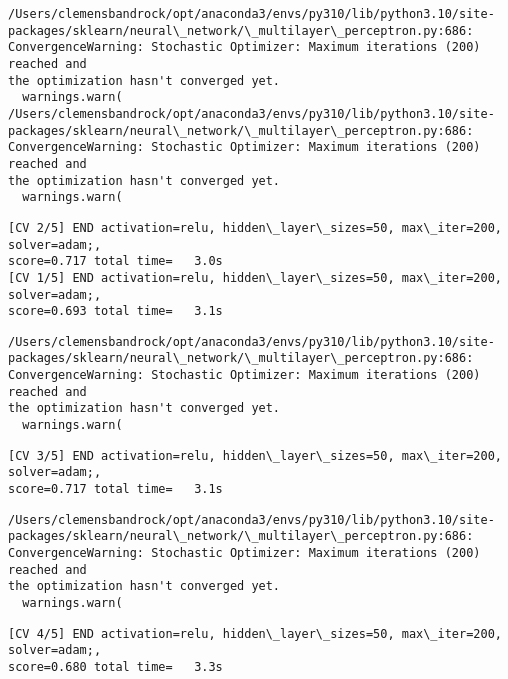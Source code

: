 \documentclass[11pt]{article}
\begin{document}
    \begin{Verbatim}[commandchars=\\\{\}]
/Users/clemensbandrock/opt/anaconda3/envs/py310/lib/python3.10/site-
packages/sklearn/neural\_network/\_multilayer\_perceptron.py:686:
ConvergenceWarning: Stochastic Optimizer: Maximum iterations (200) reached and
the optimization hasn't converged yet.
  warnings.warn(
/Users/clemensbandrock/opt/anaconda3/envs/py310/lib/python3.10/site-
packages/sklearn/neural\_network/\_multilayer\_perceptron.py:686:
ConvergenceWarning: Stochastic Optimizer: Maximum iterations (200) reached and
the optimization hasn't converged yet.
  warnings.warn(
    \end{Verbatim}

    \begin{Verbatim}[commandchars=\\\{\}]
[CV 2/5] END activation=relu, hidden\_layer\_sizes=50, max\_iter=200, solver=adam;,
score=0.717 total time=   3.0s
[CV 1/5] END activation=relu, hidden\_layer\_sizes=50, max\_iter=200, solver=adam;,
score=0.693 total time=   3.1s
    \end{Verbatim}

    \begin{Verbatim}[commandchars=\\\{\}]
/Users/clemensbandrock/opt/anaconda3/envs/py310/lib/python3.10/site-
packages/sklearn/neural\_network/\_multilayer\_perceptron.py:686:
ConvergenceWarning: Stochastic Optimizer: Maximum iterations (200) reached and
the optimization hasn't converged yet.
  warnings.warn(
    \end{Verbatim}

    \begin{Verbatim}[commandchars=\\\{\}]
[CV 3/5] END activation=relu, hidden\_layer\_sizes=50, max\_iter=200, solver=adam;,
score=0.717 total time=   3.1s
    \end{Verbatim}

    \begin{Verbatim}[commandchars=\\\{\}]
/Users/clemensbandrock/opt/anaconda3/envs/py310/lib/python3.10/site-
packages/sklearn/neural\_network/\_multilayer\_perceptron.py:686:
ConvergenceWarning: Stochastic Optimizer: Maximum iterations (200) reached and
the optimization hasn't converged yet.
  warnings.warn(
    \end{Verbatim}

    \begin{Verbatim}[commandchars=\\\{\}]
[CV 4/5] END activation=relu, hidden\_layer\_sizes=50, max\_iter=200, solver=adam;,
score=0.680 total time=   3.3s
    \end{Verbatim}
\end{document}
